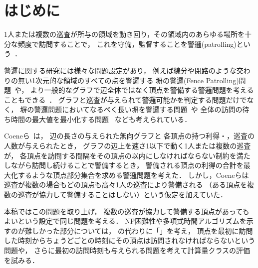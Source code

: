 
\section{はじめに}

1人または複数の巡査が所与の領域を動き回り，その領域内のあらゆる場所を十分な頻度で訪問することで，
これを守備，監督することを警邏(patrolling)という~\cite{czyzowicz2011boundary}．

警邏に関する研究には様々な問題設定があり，
例えば線分や閉路のような交わりの無い1次元的な領域のすべての点を警邏する
塀の警邏(Fence Patrolling)問題~\cite{chen2013fence, czyzowicz2011boundary}や，
より一般的なグラフで辺全体ではなく頂点を警備する警邏問題を考えることもできる~\cite{coene2011charlemagne}．
グラフと巡査が与えられて警邏可能かを判定する問題だけでなく，
塀の警邏問題においてなるべく長い塀を警邏する問題~\cite{czyzowicz2011boundary}や
全体の訪問の待ち時間の最大値を最小化する問題~\cite{chen2013fence}
なども考えられている．

Coeneら~\cite{coene2011charlemagne}は，
辺の長さの与えられた無向グラフと
各頂点の持つ利得・{\timelimit}，巡査の人数が与えられたとき，
グラフの辺上を速さ1以下で動く1人または複数の巡査が，
各頂点を訪問する間隔をその頂点の{\timelimit}以内にしなければならない制約を満たしながら訪問し続けることで警備するとき，
警備される頂点の利得の合計を最大化するような頂点部分集合を求める警邏問題を考えた．
しかし，Coeneらは巡査が複数の場合もどの頂点も高々1人の巡査により警備される
（ある頂点を複数の巡査が協力して警備することはしない）という仮定を加えていた．

本稿ではこの問題を取り上げ，
複数の巡査が協力して警備する頂点があってもよいという設定で同じ問題を考える．
NP困難性や多項式時間アルゴリズムを示すのが難しかった部分については，
{\timelimit}の代わりに「{\period}」を考え，
頂点を最初に訪問した時刻からちょうど{\period}ごとの時刻にその頂点は訪問されなければならないという問題や，
さらに最初の訪問時刻も与えられる問題を考えて計算量クラスの評価を試みる．



